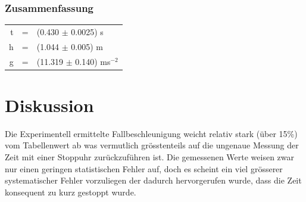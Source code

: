 \documentclass[12pt,a4paper]{article}
\newcommand{\h}{1.044 }
\begin{document}
\subsubsection*{Zusammenfassung}
\begin{tabular}{rcl}
t & = & (0.430 $\pm$ 0.0025) s\\
h & = & (\h $\pm$ 0.005) m\\
g & = & (11.319 $\pm$ 0.140) ms${}^{-2}$\\
\end{tabular}

\section*{Diskussion}
Die Experimentell ermittelte Fallbeschleunigung weicht relativ stark (\"uber 15\%) vom Tabellenwert ab was vermutlich gr\"osstenteils auf die ungenaue Messung der Zeit mit einer Stoppuhr zur\"uckzuf\"uhren ist. Die gemessenen Werte weisen zwar nur einen geringen statistischen Fehler auf, doch es scheint ein viel gr\"osserer systematischer Fehler vorzuliegen der dadurch hervorgerufen wurde, dass die Zeit konsequent zu kurz gestoppt wurde.
\end{document}

